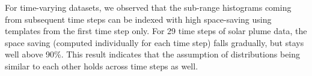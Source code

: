 For time-varying datasets, we observed that the sub-range histograms coming from subsequent time steps can be indexed with high space-saving using templates from the first time step only. For 29 time steps of solar plume data, the space saving (computed individually for each time step) falls gradually, but stays well above 90\%. This result indicates that the assumption of distributions being similar to each other holds across time steps as well.
